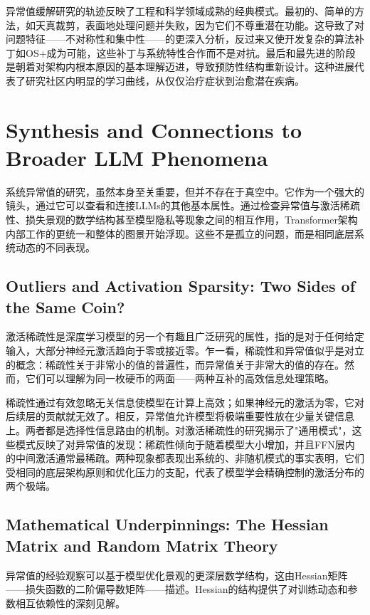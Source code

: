 \documentclass{article}
\begin{document}
异常值缓解研究的轨迹反映了工程和科学领域成熟的经典模式。最初的、简单的方法，如天真裁剪，表面地处理问题并失败，因为它们不尊重潜在功能。这导致了对问题特征——不对称性和集中性——的更深入分析，反过来又使开发复杂的算法补丁如OS+成为可能，这些补丁与系统特性合作而不是对抗。最后和最先进的阶段是朝着对架构内根本原因的基本理解迈进，导致预防性结构重新设计。这种进展代表了研究社区内明显的学习曲线，从仅仅治疗症状到治愈潜在疾病。

\section{Synthesis and Connections to Broader LLM Phenomena}

系统异常值的研究，虽然本身至关重要，但并不存在于真空中。它作为一个强大的镜头，通过它可以查看和连接LLMs的其他基本属性。通过检查异常值与激活稀疏性、损失景观的数学结构甚至模型隐私等现象之间的相互作用，Transformer架构内部工作的更统一和整体的图景开始浮现。这些不是孤立的问题，而是相同底层系统动态的不同表现。

\subsection{Outliers and Activation Sparsity: Two Sides of the Same Coin?}

激活稀疏性是深度学习模型的另一个有趣且广泛研究的属性，指的是对于任何给定输入，大部分神经元激活趋向于零或接近零。乍一看，稀疏性和异常值似乎是对立的概念：稀疏性关于非常小的值的普遍性，而异常值关于非常大的值的存在。然而，它们可以理解为同一枚硬币的两面——两种互补的高效信息处理策略。

稀疏性通过有效忽略无关信息使模型在计算上高效；如果神经元的激活为零，它对后续层的贡献就无效了。相反，异常值允许模型将极端重要性放在少量关键信息上。两者都是选择性信息路由的机制。对激活稀疏性的研究揭示了"通用模式"，这些模式反映了对异常值的发现：稀疏性倾向于随着模型大小增加，并且FFN层内的中间激活通常最稀疏。两种现象都表现出系统的、非随机模式的事实表明，它们受相同的底层架构原则和优化压力的支配，代表了模型学会精确控制的激活分布的两个极端。

\subsection{Mathematical Underpinnings: The Hessian Matrix and Random Matrix Theory}

异常值的经验观察可以基于模型优化景观的更深层数学结构，这由Hessian矩阵——损失函数的二阶偏导数矩阵——描述。Hessian的结构提供了对训练动态和参数相互依赖性的深刻见解。
\end{document}

